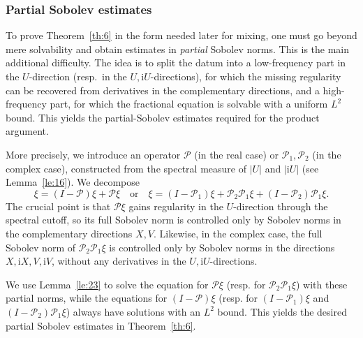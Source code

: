\documentclass[11 pt]{amsart}
\theoremstyle{definition}
\numberwithin{equation}{section}
\begin{document}
\subsubsection{Partial Sobolev estimates}\label{sec:53} To prove Theorem~\ref{th:6} in the form needed later for mixing, one must go
beyond mere solvability and obtain estimates in \emph{partial} Sobolev norms.
This is the main additional difficulty. The idea is to split the datum into a low-frequency part in the \(U\)-direction
(resp.\ in the \(U,\mathrm{i}U\)-directions), for which the missing regularity
can be recovered from derivatives in the complementary directions, and a
high-frequency part, for which the fractional equation is solvable with a
uniform \(L^2\) bound. This yields the partial-Sobolev
estimates required for the product argument.


More precisely, we introduce an operator
$\mathcal{P}$ (in the real case) or $\mathcal{P}_1,\mathcal{P}_2$ (in the
complex case), constructed from the spectral measure of $|U|$ and
$|\mathrm{i}U|$ (see Lemma~\ref{le:16}). We decompose
\[
  \xi = (I-\mathcal{P})\xi + \mathcal{P}\xi
  \quad\text{or}\quad
  \xi = (I-\mathcal{P}_1)\xi + \mathcal{P}_2\mathcal{P}_1\xi
          + (I-\mathcal{P}_2)\mathcal{P}_1\xi.
\]
The crucial point is that \(\mathcal P\xi\) gains regularity in the \(U\)-direction
through the spectral cutoff, so its full Sobolev norm is controlled only by
Sobolev norms in the complementary directions \(X,V\). Likewise, in the
complex case, the full Sobolev norm of \(\mathcal P_2\mathcal P_1\xi\) is
controlled only by Sobolev norms in the directions
\(X,\mathrm{i}X,V,\mathrm{i}V\), without any derivatives in the
\(U,\mathrm{i}U\)-directions.

We use Lemma~\ref{le:23} to solve the equation for $\mathcal{P}\xi$ (resp. for
$\mathcal{P}_2\mathcal{P}_1\xi$) with these partial norms, while the equations
for $(I-\mathcal{P})\xi$ (resp. for $(I-\mathcal{P}_1)\xi$ and
$(I-\mathcal{P}_2)\mathcal{P}_1\xi$) always have solutions with an $L^2$ bound.
This yields the desired partial Sobolev estimates in Theorem~\ref{th:6}.
\end{document}
